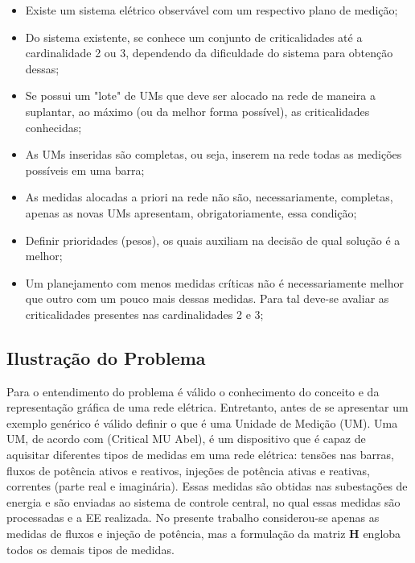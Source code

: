 \documentclass[12pt]{article}
\begin{document}
\begin{itemize}
	\item Existe um sistema elétrico observável com um respectivo plano de medição;
	
	\item Do sistema existente, se conhece um conjunto de criticalidades até a cardinalidade 2 ou 3, dependendo da dificuldade do sistema para obtenção dessas;
	
	\item Se possui um "lote" de UMs que deve ser alocado na rede de maneira a suplantar, ao máximo (ou da melhor forma possível), as criticalidades conhecidas;

	\item As UMs inseridas são completas, ou seja, inserem na rede todas as medições possíveis em uma barra;
	
	\item As medidas alocadas a priori na rede não são, necessariamente, completas, apenas as novas UMs apresentam, obrigatoriamente, essa condição;	
	
	
	\item Definir prioridades (pesos), os quais auxiliam na decisão de qual solução é a melhor;
	
	\item Um planejamento com menos medidas críticas não é necessariamente melhor que outro com um pouco mais dessas medidas. Para tal deve-se avaliar as criticalidades presentes nas cardinalidades 2 e 3;
	
\end{itemize}

\subsection{Ilustração do Problema}	
	
	Para o entendimento do problema é válido o conhecimento do conceito e da representação gráfica de uma rede elétrica. Entretanto, antes de se apresentar um exemplo genérico é válido definir o que é uma Unidade de Medição (UM). Uma UM, de acordo com (Critical MU Abel), é um dispositivo que é capaz de aquisitar diferentes tipos de medidas em uma rede elétrica: tensões nas barras, fluxos de potência ativos e reativos, injeções de potência ativas e reativas, correntes (parte real e imaginária). Essas medidas são obtidas nas subestações de energia e são enviadas ao sistema de controle central, no qual essas medidas são processadas e a EE realizada. No presente trabalho considerou-se apenas as medidas de fluxos e injeção de potência, mas a formulação da matriz $\mathbf{H}$ engloba todos os demais tipos de medidas. 
	
\end{document}
